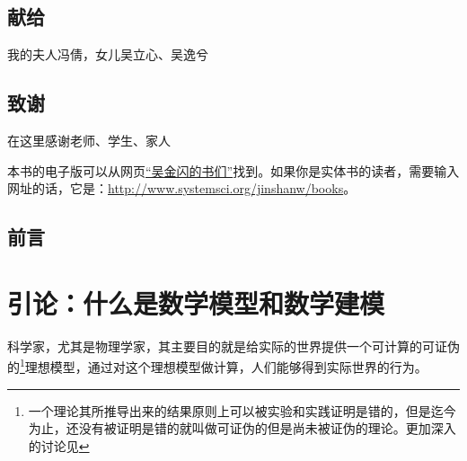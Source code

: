 \documentclass{ctexbook}
\newcommand{\FigLabel}[1]{\label{#1}}
\begin{document}
\tableofcontents




\chapter*{献给}
\begin{minipage}[l]{0.3\textwidth}
\hspace{4cm}
\end{minipage}
\begin{minipage}[l]{0.25\textwidth}
	我的夫人冯倩，女儿吴立心、吴逸兮
\end{minipage}
                
     
\chapter*{致谢}
在这里感谢老师、学生、家人

本书的电子版可以从网页\href{http://www.systemsci.org/jinshanw/books}{“吴金闪的书们”}找到。如果你是实体书的读者，需要输入网址的话，它是：\href{http://www.systemsci.org/jinshanw/books}{http://www.systemsci.org/jinshanw/books}。

\chapter*{前言}


\part{引论：什么是数学模型和数学建模}
科学家，尤其是物理学家，其主要目的就是给实际的世界提供一个可计算的可证伪的\footnote{一个理论其所推导出来的结果原则上可以被实验和实践证明是错的，但是迄今为止，还没有被证明是错的就叫做可证伪的但是尚未被证伪的理论。更加深入的讨论见\cite{Popper:Logic}}理想模型，通过对这个理想模型做计算，人们能够得到实际世界的行为。
\end{document}
